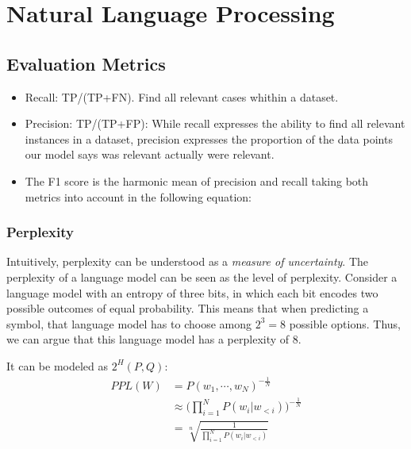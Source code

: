 \chapter{Natural Language Processing}
\section{Evaluation Metrics}
\label{sec:nlp_eval_metrics}

\begin{itemize}
	\item Recall: TP/(TP+FN). Find all relevant cases whithin a dataset.
	\item Precision: TP/(TP+FP): While recall expresses the ability to find all relevant instances in a dataset, precision expresses the proportion of the data points our model says was relevant actually were relevant.
	\item The F1 score is the harmonic mean of precision and recall taking both metrics into account in the following equation:
\end{itemize}

\subsection{Perplexity}

Intuitively, perplexity can be understood as a \textit{measure of uncertainty}. The perplexity of a language model can be seen as the level of perplexity. Consider a language model with an entropy of three bits, in which each bit encodes two possible outcomes of equal probability. This means that when predicting a symbol, that language model has to choose among $2^3=8$ possible options. Thus, we can argue that this language model has a perplexity of 8.

It can be modeled as $2^H(P,Q)$:
\begin{align*}
	PPL(W) &= P(w_1,\cdots, w_N)^{-\frac{1}{N}}\\
	&\approx \Bigg(\prod_{i=1}^N P(w_i|w_{<i})\Bigg)^{-\frac{1}{N}}\\
	&= \sqrt[n]{\frac{1}{\prod_{i=1}^{N} P(w_{i}|w_{<i})}}
\end{align*}


